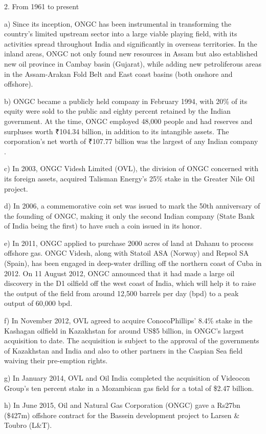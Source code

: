 \documentclass[11pt,a4paper]{article}
\begin{document}
2. From 1961 to present

a) Since its inception, ONGC has been instrumental in transforming the country's limited upstream sector into a large viable playing field, with its activities spread throughout India and significantly in overseas territories. In the inland areas, ONGC not only found new resources in Assam but also established new oil province in Cambay basin (Gujarat), while adding new petroliferous areas in the Assam-Arakan Fold Belt and East coast basins (both onshore and offshore).

b) ONGC became a publicly held company in February 1994, with 20\% of its equity were sold to the public and eighty percent retained by the Indian government. At the time, ONGC employed 48,000 people and had reserves and surpluses worth ₹104.34 billion, in addition to its intangible assets. The corporation's net worth of ₹107.77 billion was the largest of any Indian company .

c) In 2003, ONGC Videsh Limited (OVL), the division of ONGC concerned with its foreign assets, acquired Talisman Energy's 25\% stake in the Greater Nile Oil project.

d) In 2006, a commemorative coin set was issued to mark the 50th anniversary of the founding of ONGC, making it only the second Indian company (State Bank of India being the first) to have such a coin issued in its honor.

e) In 2011, ONGC applied to purchase 2000 acres of land at Dahanu to process offshore gas. ONGC Videsh, along with Statoil ASA (Norway) and Repsol SA (Spain), has been engaged in deep-water drilling off the northern coast of Cuba in 2012. On 11 August 2012, ONGC announced that it had made a large oil discovery in the D1 oilfield off the west coast of India, which will help it to raise the output of the field from around 12,500 barrels per day (bpd) to a peak output of 60,000 bpd.

f) In November 2012, OVL agreed to acquire ConocoPhillips' 8.4\% stake in the Kashagan oilfield in Kazakhstan for around US\$5 billion, in ONGC's largest acquisition to date. The acquisition is subject to the approval of the governments of Kazakhstan and India and also to other partners in the Caspian Sea field waiving their pre-emption rights.

g) In January 2014, OVL and Oil India completed the acquisition of Videocon Group's ten percent stake in a Mozambican gas field for a total of \$2.47 billion.

h) In June 2015, Oil and Natural Gas Corporation (ONGC) gave a Rs27bn (\$427m) offshore contract for the Bassein development project to Larsen \& Toubro (L\&T).
\end{document}
